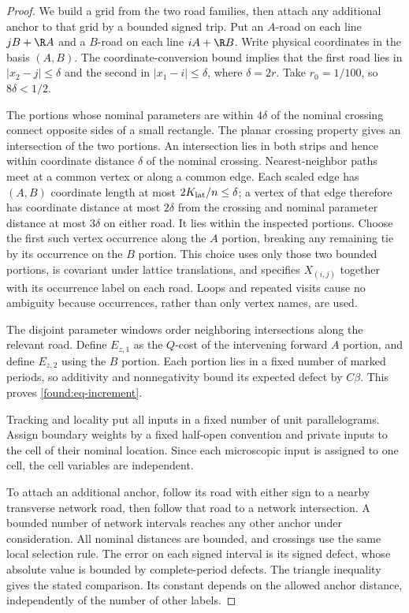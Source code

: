 \begin{proof}
We build a grid from the two road families, then attach any additional
anchor to that grid by a bounded signed trip.  Put an $A$-road on each
line $jB+\R A$ and a $B$-road on each
line $iA+\R B$.  Write physical coordinates in the basis $(A,B)$.
The coordinate-conversion bound implies that the first road lies in
$|x_2-j|\leq\delta$ and the second in $|x_1-i|\leq\delta$, where
$\delta=2r$.  Take $r_0=1/100$, so $8\delta<1/2$.

The portions whose nominal parameters are within $4\delta$ of the
nominal crossing connect opposite sides of a small rectangle.
The planar crossing property gives an intersection of the two portions.
An intersection lies in both strips and hence within coordinate
distance $\delta$ of the nominal crossing.  Nearest-neighbor paths
meet at a common vertex or along a common edge.  Each scaled edge has
$(A,B)$ coordinate length at most $2K_{\rm lat}/n\leq\delta$; a vertex
of that edge therefore has coordinate distance at most $2\delta$
from the crossing and nominal parameter distance at most $3\delta$
on either road.  It lies within the inspected portions.  Choose the
first such vertex occurrence along the
$A$ portion, breaking any remaining tie by its occurrence on the $B$
portion.  This choice uses only those two bounded portions, is covariant
under lattice translations, and specifies $X_{(i,j)}$ together with its
occurrence label on each road.  Loops and repeated visits cause no
ambiguity because occurrences, rather than only vertex names, are used.

The disjoint parameter windows order neighboring intersections along
the relevant road.  Define $E_{z,1}$ as the $Q$-cost of the intervening
forward $A$ portion, and define $E_{z,2}$ using the $B$ portion.
Each portion lies in a fixed number of marked periods, so additivity
and nonnegativity bound its expected defect by $C\beta$.  This proves
\eqref{found:eq-increment}.

Tracking and locality put all inputs in a fixed number of unit
parallelograms.  Assign boundary weights by a fixed half-open convention
and private inputs to the cell of their nominal location.  Since each
microscopic input is assigned to one cell, the cell variables are
independent.

To attach an additional anchor, follow its road with either sign to
a nearby transverse network road, then follow that road to a network
intersection.  A bounded number of network intervals reaches any
other anchor under consideration.  All nominal distances are bounded,
and crossings use the same local selection rule.  The error on each
signed interval is its signed defect, whose absolute value is bounded
by complete-period defects.  The triangle inequality gives the stated
comparison.  Its constant depends on the allowed anchor distance,
independently of the number of other labels.
\end{proof}

